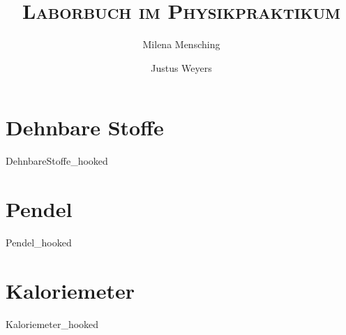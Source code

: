 

\title{\textsc{Laborbuch im Physikpraktikum}}
\author{Milena Mensching \and Justus Weyers}


	\maketitle
	\newpage	
    \tableofcontents
    \newpage
    
    \part{Dehnbare Stoffe}
	{DehnbareStoffe_hooked}
	
	\part{Pendel}
	{Pendel_hooked}
	
	\part{Kaloriemeter}
	{Kaloriemeter_hooked}
	
	\newpage
    
    
	\newpage
	\listoffigures
	\listoftables

